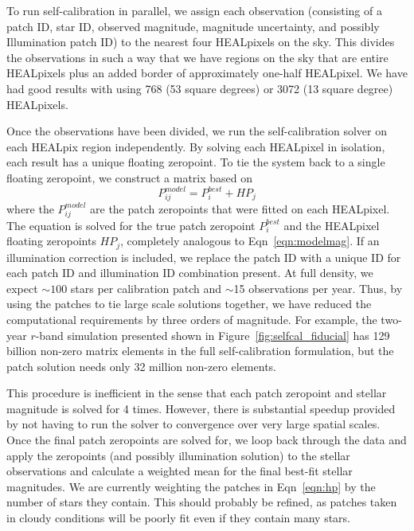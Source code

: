 \documentclass[12pt,preprint]{aastex}
\begin{document}
To run self-calibration in parallel, we assign each observation (consisting of a patch ID, star ID, observed magnitude, magnitude uncertainty, and possibly Illumination patch ID) to the nearest four HEALpixels on the sky.  This divides the observations in such a way that we have regions on the sky that are entire HEALpixels plus an added border of approximately one-half HEALpixel.  We have had good results with using 768 (53 square degrees) or 3072 (13 square degree) HEALpixels.  

Once the observations have been divided, we run the self-calibration solver on each HEALpix region independently.  By solving each HEALpixel in isolation, each result has a unique floating zeropoint.  To tie the system back to a single floating zeropoint, we construct a matrix based on
\begin{equation}\label{eqn:hp}
P^{model}_{ij} = P^{best}_{i} + HP_{j}
\end{equation}
where the $P^{model}_{ij}$ are the patch zeropoints that were fitted on each HEALpixel.  The equation is solved for the true patch zeropoint $P^{best}_{i}$ and the HEALpixel floating zeropoints $HP_{j}$, completely analogous to Eqn~\ref{eqn:modelmag}.  If an illumination correction is included, we replace the patch ID with a unique ID for each patch ID and illumination ID combination present.  At full density, we expect $\sim100$ stars per calibration patch and $\sim$15 observations per year.  Thus, by using the patches to tie large scale solutions together, we have reduced the computational requirements by three orders of magnitude.  For example, the two-year $r$-band simulation presented shown in Figure~\ref{fig:selfcal_fiducial} has 129 billion non-zero matrix elements in the full self-calibration formulation, but the patch solution needs only 32 million non-zero elements.  

This procedure is inefficient in the sense that each patch zeropoint and stellar magnitude is solved for 4 times.  However, there is substantial speedup provided by not having to run the solver to convergence over very large spatial scales.  Once the final patch zeropoints are solved for, we loop back through the data and apply the zeropoints (and possibly illumination solution) to the stellar observations and calculate a weighted mean for the final best-fit stellar magnitudes.  We are currently weighting the patches in Eqn~\ref{eqn:hp} by the number of stars they contain.  This should probably be refined, as patches taken in cloudy conditions will be poorly fit even if they contain many stars.  
\end{document}
